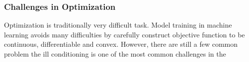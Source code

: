 \subsubsection{Challenges in Optimization}

Optimization is traditionally very difficult task. Model training in machine learning avoids many difficulties by carefully construct objective function to be continuous, differentiable and convex. However, there are still a few common problem
the ill conditioning is one of the most common challenges in the 